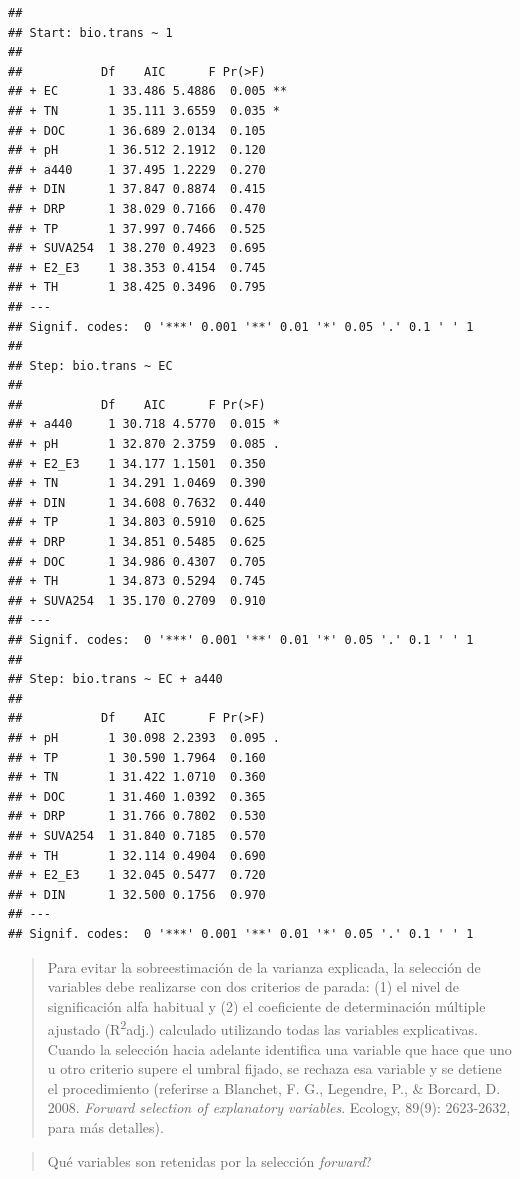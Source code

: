 \documentclass[
]{book}
\begin{document}
\begin{verbatim}
## 
## Start: bio.trans ~ 1 
## 
##           Df    AIC      F Pr(>F)   
## + EC       1 33.486 5.4886  0.005 **
## + TN       1 35.111 3.6559  0.035 * 
## + DOC      1 36.689 2.0134  0.105   
## + pH       1 36.512 2.1912  0.120   
## + a440     1 37.495 1.2229  0.270   
## + DIN      1 37.847 0.8874  0.415   
## + DRP      1 38.029 0.7166  0.470   
## + TP       1 37.997 0.7466  0.525   
## + SUVA254  1 38.270 0.4923  0.695   
## + E2_E3    1 38.353 0.4154  0.745   
## + TH       1 38.425 0.3496  0.795   
## ---
## Signif. codes:  0 '***' 0.001 '**' 0.01 '*' 0.05 '.' 0.1 ' ' 1
## 
## Step: bio.trans ~ EC 
## 
##           Df    AIC      F Pr(>F)  
## + a440     1 30.718 4.5770  0.015 *
## + pH       1 32.870 2.3759  0.085 .
## + E2_E3    1 34.177 1.1501  0.350  
## + TN       1 34.291 1.0469  0.390  
## + DIN      1 34.608 0.7632  0.440  
## + TP       1 34.803 0.5910  0.625  
## + DRP      1 34.851 0.5485  0.625  
## + DOC      1 34.986 0.4307  0.705  
## + TH       1 34.873 0.5294  0.745  
## + SUVA254  1 35.170 0.2709  0.910  
## ---
## Signif. codes:  0 '***' 0.001 '**' 0.01 '*' 0.05 '.' 0.1 ' ' 1
## 
## Step: bio.trans ~ EC + a440 
## 
##           Df    AIC      F Pr(>F)  
## + pH       1 30.098 2.2393  0.095 .
## + TP       1 30.590 1.7964  0.160  
## + TN       1 31.422 1.0710  0.360  
## + DOC      1 31.460 1.0392  0.365  
## + DRP      1 31.766 0.7802  0.530  
## + SUVA254  1 31.840 0.7185  0.570  
## + TH       1 32.114 0.4904  0.690  
## + E2_E3    1 32.045 0.5477  0.720  
## + DIN      1 32.500 0.1756  0.970  
## ---
## Signif. codes:  0 '***' 0.001 '**' 0.01 '*' 0.05 '.' 0.1 ' ' 1
\end{verbatim}

\begin{quote}
Para evitar la sobreestimación de la varianza explicada, la selección de variables debe realizarse con dos criterios de parada: (1) el nivel de significación alfa habitual y (2) el coeficiente de determinación múltiple ajustado (R\textsuperscript{2}adj.) calculado utilizando todas las variables explicativas. Cuando la selección hacia adelante identifica una variable que hace que uno u otro criterio supere el umbral fijado, se rechaza esa variable y se detiene el procedimiento (referirse a Blanchet, F. G., Legendre, P., \& Borcard, D. 2008. \emph{Forward selection of explanatory variables}. Ecology, 89(9): 2623-2632, para más detalles).
\end{quote}

\begin{quote}
Qué variables son retenidas por la selección \emph{forward}?
\end{quote}
\end{document}
